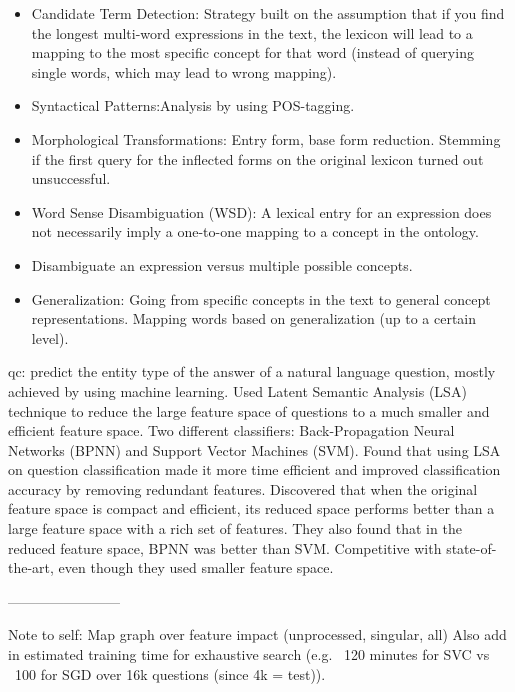\begin{itemize}
	\item Candidate Term Detection: Strategy built on the assumption that if you find the longest multi-word expressions in the text, 
	the lexicon will lead to a mapping to the most specific concept for that word (instead of querying single words, which may lead to wrong mapping).
	\item Syntactical Patterns:Analysis by using POS-tagging.
	\item Morphological Transformations: Entry form, base form reduction. 
	Stemming if the first query for the inflected forms on the original lexicon turned out unsuccessful.
	\item Word Sense Disambiguation (WSD): A lexical entry for an expression does not necessarily imply a one-to-one mapping to a concept in the ontology. 
	\item Disambiguate an expression versus multiple possible concepts.
	\item Generalization: Going from specific concepts in the text to general concept representations. Mapping words based on generalization (up to a certain level).
\end{itemize}
\cite{Bloehdorn2004}

\gls{qc}: predict the entity type of the answer of a natural language question, mostly achieved by using machine learning. 
Used Latent Semantic Analysis (LSA) technique to reduce the large feature space of questions to a much smaller and efficient feature space. 
Two different classifiers: Back-Propagation Neural Networks (BPNN) and Support Vector Machines (SVM). 
Found that using LSA on question classification made it more time efficient and improved classification accuracy by removing redundant features. 
Discovered that when the original feature space is compact and efficient, its reduced space performs better than a large feature space with a rich set of features. 
They also found that in the reduced feature space, BPNN was better than SVM.  
Competitive with state-of-the-art, even though they used smaller feature space.
\cite{Loni2011}

------------------------

Note to self: Map graph over feature impact (unprocessed, singular, all)
Also add in estimated training time for exhaustive search (e.g. ~120 minutes for SVC vs ~100 for SGD over 16k questions (since 4k = test)). 


\begin{comment}
I can either use \verb|\cite{ChangLin2011}| and get: \cite{ChangLin2011}. \\
Or I can use \verb|\citet{ChangLin2011}| and get: \citet{ChangLin2011}. \\
\verb|\cite| is based on \verb|\renewcommand*{\cite}{\autocite}|, \\
and \verb|\citet| is based on \verb|\newcommand{\citet}{\textcite}|. \\
Unfortunately, you can't get the year, but at least you can now get in-text citation. 
\end{comment}



